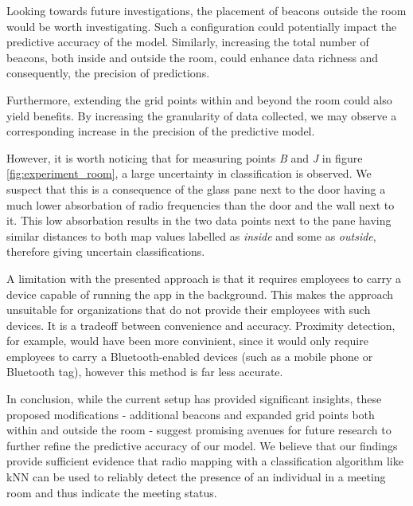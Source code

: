 Looking towards future investigations, the placement of beacons outside the room would be worth investigating.
Such a configuration could potentially impact the predictive accuracy of the model.
Similarly, increasing the total number of beacons, both inside and outside the room, could enhance data richness and consequently, the precision of predictions.

Furthermore, extending the grid points within and beyond the room could also yield benefits. By increasing the granularity of data collected, we may observe a corresponding increase in the precision of the predictive model. 

However, it is worth noticing that for measuring points \textit{B} and \textit{J} in figure \ref{fig:experiment_room}, a large uncertainty in classification is observed.
We suspect that this is a consequence of the glass pane next to the door having a much lower absorbation of radio frequencies than the door and the wall next to it.
This low absorbation results in the two data points next to the pane having similar distances to both map values labelled as \textit{inside} and some as \textit{outside}, therefore giving uncertain classifications.

A limitation with the presented approach is that it requires employees to carry a device capable of running the app in the background.
This makes the approach unsuitable for organizations that do not provide their employees with such devices.
It is a tradeoff between convenience and accuracy.
Proximity detection, for example, would have been more convinient, since it would only require employees to carry a Bluetooth-enabled devices (such as a mobile phone or Bluetooth tag), however this method is far less accurate.

In conclusion, while the current setup has provided significant insights, these proposed modifications - additional beacons and expanded grid points both within and outside the room - suggest promising avenues for future research to further refine the predictive accuracy of our model.
We believe that our findings provide sufficient evidence that radio mapping with a classification algorithm like kNN can be used to reliably detect the presence of an individual in a meeting room and thus indicate the meeting status.